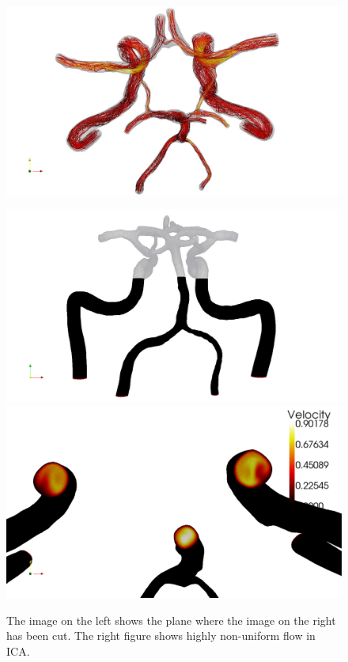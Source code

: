 \begin{figure}
          {\includegraphics[width=\fullfig]{chapters/kvs-2/pdf/cok_top_steam_white.pdf}}
\end{figure}

\begin{figure}
  \centering
  \includegraphics[width=\largefig]{chapters/kvs-2/pdf/cok_slice.pdf} \\
  \includegraphics[width=\largefig]{chapters/kvs-2/pdf/cok_ica_vel_peak_syst.pdf}
  \caption{The image on the left shows the plane where the image on
    the right has been cut.  The right figure shows highly
    non-uniform flow in ICA.}
  \label{fig:kvs-2:cok_ica}
\end{figure}
